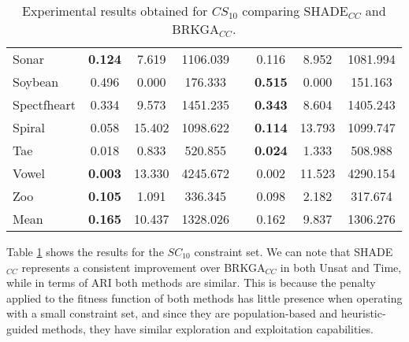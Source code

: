 \begin{table}[!h]
{\begin{tabular}{l ccc c ccc}
			Sonar & \textbf{0.124} & 7.619 & 1106.039 && 0.116 & 8.952 & 1081.994 \\
			Soybean & 0.496 & 0.000 & 176.333 && \textbf{0.515} & 0.000 & 151.163 \\
			Spectfheart & 0.334 & 9.573 & 1451.235 && \textbf{0.343} & 8.604 & 1405.243 \\
			Spiral & 0.058 & 15.402 & 1098.622 && \textbf{0.114} & 13.793 & 1099.747 \\
			Tae & 0.018 & 0.833 & 520.855 && \textbf{0.024} & 1.333 & 508.988 \\
			Vowel & \textbf{0.003} & 13.330 & 4245.672 && 0.002 & 11.523 & 4290.154 \\
			Zoo & \textbf{0.105} & 1.091 & 336.345 && 0.098 & 2.182 & 317.674 \\
			\hline
			Mean & \textbf{0.165} & 10.437 & 1328.026 && 0.162 & 9.837 & 1306.276 \\
			\hline
			
	\end{tabular}}
	
	\caption[Experimental results obtained for $CS_{10}$ comparing SHADE$_{CC}$ and BRKGA$_{CC}$.]{Experimental results obtained for $CS_{10}$ comparing \acs{SHADE}$_{CC}$ and \acs{BRKGA}$_{CC}$.}
	\label{tab:resultsBRKGAvsSHADE10}
\end{table}

Table \ref{tab:resultsBRKGAvsSHADE10} shows the results for the $SC_{10}$ constraint set. We can note that \acs{SHADE}$_{CC}$ represents a consistent improvement over \acs{BRKGA}$_{CC}$ in both Unsat and Time, while in terms of \acs{ARI} both methods are similar. This is because the penalty applied to the fitness function of both methods has little presence when operating with a small constraint set, and since they are population-based and heuristic-guided methods, they have similar exploration and exploitation capabilities.

